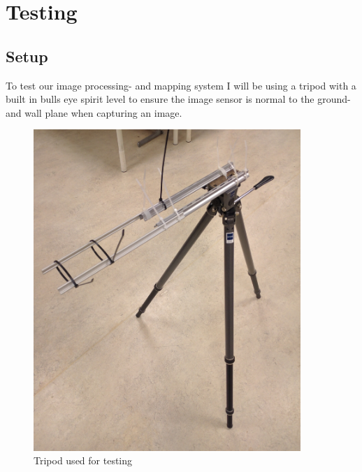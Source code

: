 \section{Testing}
\label{testing}
\subsection{Setup}
To test our image processing- and mapping system I will be using a tripod with a built in bulls eye spirit level to ensure the image sensor is normal to the ground- and wall plane when capturing an image. 
\begin{figure}[H]
\centering
\includegraphics[width=0.9\textwidth]{fig/tripod}
  \caption{Tripod used for testing}
  \label{fig:tripod}
\end{figure}
